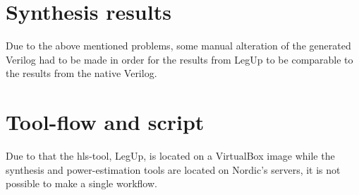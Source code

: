 \section{\label{sec:synthres}Synthesis results}
Due to the above mentioned problems, some manual alteration of the generated Verilog had to be made in order for the results from LegUp to be comparable to the results from the native Verilog.

\section{Tool-flow and script}
Due to that the \gls{hls}-tool, LegUp, is located on a VirtualBox image while the synthesis and power-estimation tools are located on Nordic's servers, it is not possible to make a single workflow.
